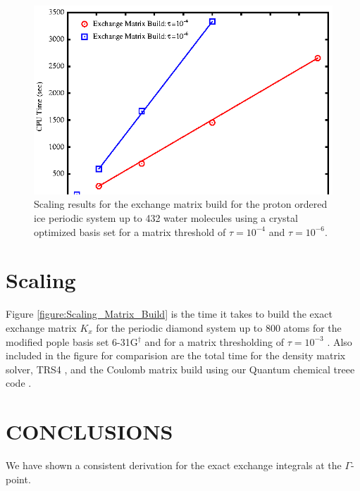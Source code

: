 \documentclass[prb,aps,nobibnotes,twocolumn,doublespace,twocolumngrid,superbib]{revtex4}
\begin{document}
%
\begin{figure}[p]
\caption{Scaling results for the exchange matrix
build  for the proton ordered ice periodic system up to 432 water molecules 
using a crystal optimized basis set\cite{CBS:511G:H,CBS:861G:MgO} for a matrix threshold of 
$\tau=10^{-4}$ and  $\tau=10^{-6}$.}
\label{figure:Scaling_Matrix_Build_Ice}
{\centering \includegraphics{Timing_pIce_ONX_2.ps} \par} 
\end{figure}


\section{Scaling}
 
Figure \ref{figure:Scaling_Matrix_Build} is the time it takes to build the
exact exchange matrix  \( K_{x} \) for the periodic diamond system up to 800 atoms for the modified pople 
basis set 6-31G$ ^\dagger$ \cite{Pople92} and for a matrix thresholding of $\tau=10^{-3}$ .
Also included in the figure for comparision are the total time for the
density matrix solver, TRS4 \cite{ANiklasson03}, 
and the Coulomb matrix build using our Quantum chemical treee code \cite{CTymczak04c}. 




\section{CONCLUSIONS}
We have shown a consistent derivation for the exact exchange integrals at the $\Gamma$-point. 
\end{document}
